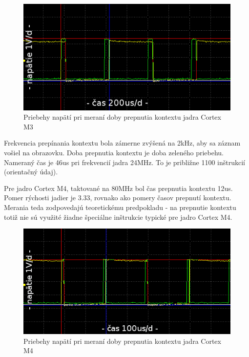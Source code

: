 \begin{figure}[ht]
\begin{center}
\begin{minipage}{1.1\linewidth}
\begin{center}
\includegraphics[width=.7\textwidth]{images/cm3_context_switch_02_.png}
\caption{Priebehy napätí pri meraní doby prepnutia kontextu jadra Cortex M3}
\label{obr2}
\end{center}
\end{minipage}
\end{center}
\end{figure}

Frekvencia prepínania kontextu bola zámerne zvýšená na 2kHz, aby sa záznam vošiel na obrazovku. Doba prepnutia kontextu je doba zeleného priebehu. Nameraný čas je 46us pri frekvencií jadra 24MHz. To je približne 1100 inštrukcií (orientačný údaj). 

Pre jadro Cortex M4, taktované na 80MHz bol čas prepnutia kontextu 12us. Pomer rýchosti jadier je 3.33, rovnako ako pomery časov prepnutí kontextu. Merania teda zodpovedajú teoretickému predpokladu - na prepnutie kontextu totiž nie sú využité žiadne špeciálne inštrukcie typické pre jadro Cortex M4.

\begin{figure}[ht]
\begin{center}
\begin{minipage}{1.1\linewidth}
\begin{center}
\includegraphics[width=.7\textwidth]{images/cm4_context_switch_02_.png}
\caption{Priebehy napätí pri meraní doby prepnutia kontextu jadra Cortex M4}
\label{obr2}
\end{center}
\end{minipage}
\end{center}
\end{figure}

